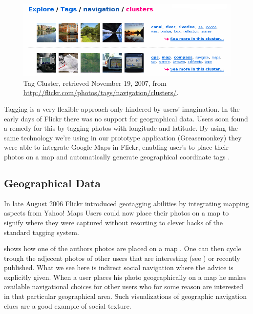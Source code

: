 \begin{figure}
  \begin{whole}
    \includegraphics[width=\wholewidth]{scrsh_flickr_tagcluster}
    \caption[Flickr Tag Cluster]{%
       Tag Cluster,
       retrieved November 19, 2007, from
       \url{http://flickr.com/photos/tags/navigation/clusters/}.}
    \label{figure:scrsh.flickr.tagcluster}
  \end{whole}
\end{figure}

Tagging is a very flexible approach only hindered by users' imagination. In
the early days of Flickr there was no support for geographical data. Users
soon found a remedy for this by tagging photos with longitude and latitude.
By using the same technology we're using in our prototype application
(Greasemonkey) they were able to integrate Google Maps%
 in Flickr, enabling user's to place their photos on a map and automatically
generate geographical coordinate tags%
.

\subsection{Geographical Data}

In late August 2006 Flickr introduced geotagging abilities
\citep{butterfield06a} by integrating mapping aspects from Yahoo! Maps%
Users could now place their photos on a
map to signify where they were captured without resorting to clever hacks of
the standard tagging system.

 shows how one of the authors photos are
placed on a map .
One can then cycle trough the adjecent photos of other users
that are interesting (see
) or recently published.
What we see here is indirect social navigation where the advice is explicitly
given. When a user places his photo geographically on a map he makes available
navigational choices for other users who for some reason are interested in
that particular geographical area. Such visualizations of geographic
navigation clues are a good example of social texture.


